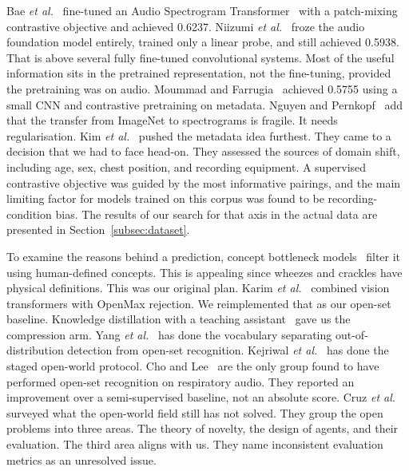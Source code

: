 \documentclass[journal,onecolumn]{IEEEtran}
\begin{document}
Bae \emph{et al.}~\cite{bae2023patchmix} fine-tuned an Audio Spectrogram
Transformer~\cite{gong2021ast} with a patch-mixing contrastive objective and achieved
0.6237. Niizumi \emph{et al.}~\cite{frozenfm2025} froze the audio foundation model
entirely, trained only a linear probe, and still achieved 0.5938. That is above several
fully fine-tuned convolutional systems. Most of the useful information sits in the
pretrained representation, not the fine-tuning, provided the pretraining was on audio.
Moummad and Farrugia~\cite{scl2023} achieved 0.5755 using a small CNN and contrastive
pretraining on metadata. Nguyen and Pernkopf~\cite{nguyen2022cotuning} add that the
transfer from ImageNet to spectrograms is fragile. It needs regularisation. Kim
\emph{et al.}~\cite{kim2025metadata} pushed the metadata idea furthest. They came to a
decision that we had to face head-on. They assessed the sources of domain shift,
including age, sex, chest position, and recording equipment. A supervised contrastive
objective was guided by the most informative pairings, and the main limiting factor for
models trained on this corpus was found to be recording-condition bias. The results of
our search for that axis in the actual data are presented in
Section~\ref{subsec:dataset}.

To examine the reasons behind a prediction, concept bottleneck
models~\cite{koh2020cbm} filter it using human-defined concepts. This is appealing
since wheezes and crackles have physical definitions. This was our original plan.
Karim \emph{et al.}~\cite{karim2024mosquito} combined vision transformers with OpenMax
rejection. We reimplemented that as our open-set baseline. Knowledge distillation with
a teaching assistant~\cite{pavel2024kd} gave us the compression arm. Yang \emph{et
al.}~\cite{yang2024ood} has done the vocabulary separating out-of-distribution
detection from open-set recognition. Kejriwal \emph{et al.}~\cite{kejriwal2024owl} has
done the staged open-world protocol. Cho and Lee~\cite{cho2025openset} are the only
group found to have performed open-set recognition on respiratory audio. They reported
an improvement over a semi-supervised baseline, not an absolute score. Cruz \emph{et
al.}~\cite{cruz2025owl} surveyed what the open-world field still has not solved. They
group the open problems into three areas. The theory of novelty, the design of agents,
and their evaluation. The third area aligns with us. They name inconsistent evaluation
metrics as an unresolved issue.
\end{document}
